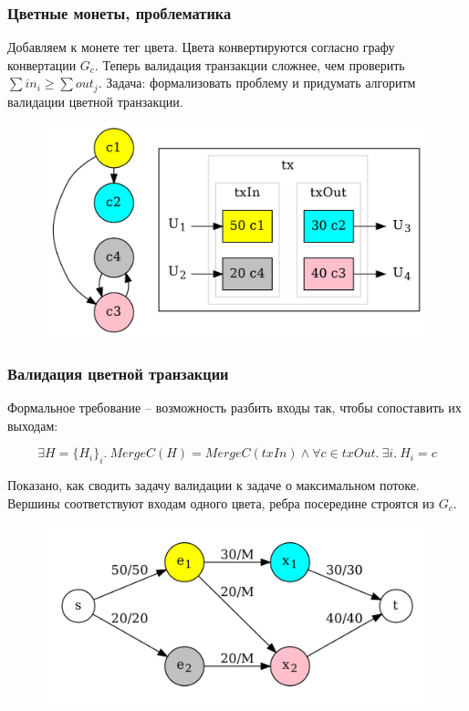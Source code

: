 \documentclass[11pt,handout,pdf,hyperref={unicode}]{beamer}
\begin{document}
\begin{frame}
  \frametitle{Цветные монеты, проблематика}

  Добавляем к монете тег цвета. Цвета конвертируются согласно графу
  конвертации $G_c$. Теперь валидация транзакции сложнее, чем
  проверить $\sum{in_i} \geq \sum {out_j}$. Задача: формализовать
  проблему и придумать алгоритм валидации цветной транзакции.

  \begin{figure}[t]
  \includegraphics[scale=0.15]{pres_colortx.png}
  \centering
  \end{figure}

\end{frame}

\begin{frame}
  \frametitle{Валидация цветной транзакции}

  Формальное требование -- возможность разбить входы так, чтобы
  сопоставить их выходам:

  \[
  \exists H = \{H_i\}_i. \ MergeC(H) = MergeC(txIn) \wedge \forall c \in txOut . \ \exists i . \ H_i = c
  \]


  Показано, как сводить задачу валидации к задаче о максимальном
  потоке. Вершины соответствуют входам одного цвета, ребра посередине
  строятся из $G_c$.

  \begin{figure}[t]
  \includegraphics[scale=0.12]{pres_colortx_graph}
  \centering
  \end{figure}
\end{frame}
\end{document}
